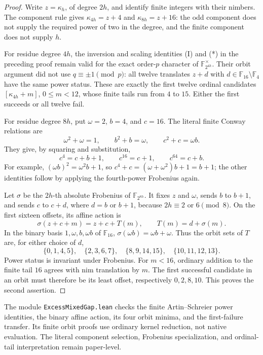 \documentclass[11pt]{article}
\theoremstyle{definition}
\theoremstyle{remark}
\begin{document}
\begin{proof}
Write $z=\kappa_h$, of degree $2h$, and identify finite integers with
their nimbers. The component rule gives
$\kappa_{4h}=z+4$ and $\kappa_{8h}=z+16$: the odd component does not
supply the required power of two in the degree, and the finite component
does not supply $h$.

For residue degree $4h$, the inversion and scaling identities (I) and (*)
in the preceding proof remain valid for the exact order-$p$ character of
$\mathbb F_{2^{4h}}^\times$. Their orbit argument did not use
$q\equiv\pm1\pmod p$: all twelve translates $z+d$ with
$d\in\mathbb F_{16}\setminus\mathbb F_4$ have the same power status.
These are exactly the first twelve ordinal candidates
$[\kappa_{4h}+m]$, $0\leq m<12$, whose finite tails run from $4$ to
$15$. Either the first succeeds or all twelve fail.

For residue degree $8h$, put $\omega=2$, $b=4$, and $c=16$.
The literal finite Conway relations are
\[
 \omega^2+\omega=1,\qquad b^2+b=\omega,\qquad
 c^2+c=\omega b.
\]
They give, by squaring and substitution,
\[
 c^4=c+b+1,\qquad c^{16}=c+1,\qquad c^{64}=c+b.
\]
For example, $(\omega b)^2=\omega^2b+1$, so
$c^4+c=(\omega+\omega^2)b+1=b+1$; the other identities follow
by applying the fourth-power Frobenius again.

Let $\sigma$ be the $2h$-th absolute Frobenius of
$\mathbb F_{2^{8h}}$. It fixes $z$ and $\omega$, sends $b$ to $b+1$,
and sends $c$ to $c+d$, where $d=b$ or $b+1$, because
$2h\equiv2$ or $6\pmod8$. On the first sixteen offsets, its affine
action is
\[
 \sigma(z+c+m)=z+c+T(m),\qquad T(m)=d+\sigma(m).
\]
In the binary basis $1,\omega,b,\omega b$ of $\mathbb F_{16}$,
$\sigma(\omega b)=\omega b+\omega$. Thus the orbit sets of $T$ are,
for either choice of $d$,
\[
 \{0,1,4,5\},\quad \{2,3,6,7\},\quad
 \{8,9,14,15\},\quad \{10,11,12,13\}.
\]
Power status is invariant under Frobenius. For $m<16$, ordinary addition
to the finite tail $16$ agrees with nim translation by $m$. The first
successful candidate in an orbit must therefore be its least offset,
respectively $0,2,8,10$. This proves the second assertion.
\end{proof}

The module \texttt{ExcessMixedGap.lean} checks the finite
Artin--Schreier power identities, the binary affine action, its four orbit
minima, and the first-failure transfer. Its finite orbit proofs use ordinary
kernel reduction, not native evaluation. The literal component selection, Frobenius specialization, and
ordinal-tail interpretation remain paper-level.
\end{document}
